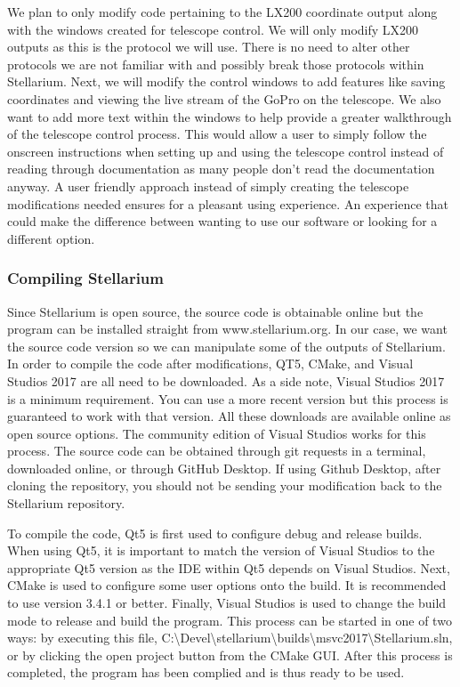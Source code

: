 \documentclass[12pt]{article}
\begin{document}
We plan to only modify code pertaining to the LX200 coordinate output along with the windows created for telescope control. We will only modify LX200 outputs as this is the protocol we will use. There is no need to alter other protocols we are not familiar with and possibly break those protocols within Stellarium. Next, we will modify the control windows to add features like saving coordinates and viewing the live stream of the GoPro on the telescope. We also want to add more text within the windows to help provide a greater walkthrough of the telescope control process. This would allow a user to simply follow the onscreen instructions when setting up and using the telescope control instead of reading through documentation as many people don’t read the documentation anyway. A user friendly approach instead of simply creating the telescope modifications needed ensures for a pleasant using experience. An experience that could make the difference between wanting to use our software or looking for a different option.

\subsubsection{Compiling Stellarium}

Since Stellarium is open source, the source code is obtainable online but the program can be installed straight from www.stellarium.org. In our case, we want the source code version so we can manipulate some of the outputs of Stellarium. In order to compile the code after modifications, QT5, CMake, and Visual Studios 2017 are all need to be downloaded. As a side note, Visual Studios 2017 is a minimum requirement. You can use a more recent version but this process is guaranteed to work with that version. All these downloads are available online as open source options. The community edition of Visual Studios works for this process. The source code can be obtained through git requests in a terminal, downloaded online, or through GitHub Desktop. If using Github Desktop, after cloning the repository, you should not be sending your modification back to the Stellarium repository.

To compile the code, Qt5 is first used to configure debug and release builds. When using Qt5, it is important to match the version of Visual Studios to the appropriate Qt5 version as the IDE within Qt5 depends on Visual Studios. Next, CMake is used to configure some user options onto the build. It is recommended to use version 3.4.1 or better. Finally, Visual Studios is used to change the build mode to release and build the program. This process can be started in one of two ways: by executing this file, C:\textbackslash{}Devel\textbackslash{}stellarium\textbackslash{}builds\textbackslash{}msvc2017\textbackslash{}Stellarium.sln, or by clicking the open project button from the CMake GUI. After this process is completed, the program has been complied and is thus ready to be used.
\end{document}

